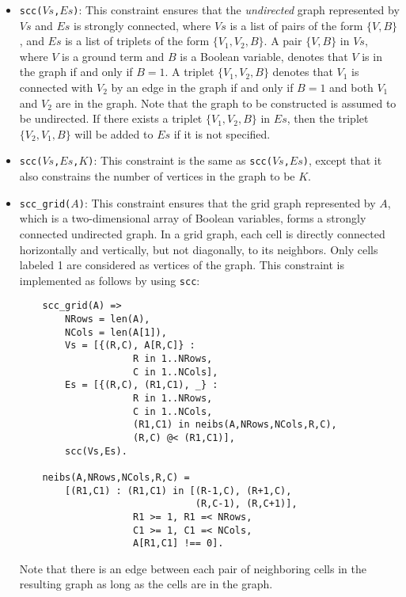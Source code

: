 \begin{itemize}
\item \texttt{scc($Vs$,$Es$)}: This constraint ensures that the \textit{undirected} graph represented by $Vs$ and $Es$ is strongly connected, where $Vs$ is a list of pairs of the form $\{V,B\}$, and $Es$ is a list of triplets of the form $\{V_1,V_2,B\}$. A pair $\{V,B\}$ in $Vs$, where $V$ is a ground term and $B$ is a Boolean variable, denotes that $V$ is in the graph if and only if $B = 1$. A triplet $\{V_1,V_2,B\}$ denotes that $V_1$ is connected with $V_2$  by an edge in the graph if and only if $B = 1$ and both $V_1$ and $V_2$ are in the graph. Note that the graph to be constructed is assumed to be undirected. If there exists a triplet $\{V_1,V_2,B\}$ in $Es$, then the triplet $\{V_2,V_1,B\}$ will be added to $Es$ if it is not specified.

\item \texttt{scc($Vs$,$Es$,$K$)}:  This constraint is the same as \texttt{scc($Vs$,$Es$)}, except that it also constrains the number of vertices in the graph to be $K$. 

\item \texttt{scc\_grid($A$)}:  This constraint ensures that the grid graph represented by $A$, which is a two-dimensional array of Boolean variables, forms a strongly connected undirected graph. In a grid graph, each cell is directly connected horizontally and vertically, but not diagonally, to its neighbors. Only cells labeled 1 are considered as vertices of the graph. This constraint is implemented as follows by using \texttt{scc}:
\begin{verbatim}
    scc_grid(A) =>
        NRows = len(A),
        NCols = len(A[1]),
        Vs = [{(R,C), A[R,C]} : 
                    R in 1..NRows, 
                    C in 1..NCols],
        Es = [{(R,C), (R1,C1), _} : 
                    R in 1..NRows, 
                    C in 1..NCols,
                    (R1,C1) in neibs(A,NRows,NCols,R,C),
                    (R,C) @< (R1,C1)],
        scc(Vs,Es).

    neibs(A,NRows,NCols,R,C) = 
        [(R1,C1) : (R1,C1) in [(R-1,C), (R+1,C), 
                               (R,C-1), (R,C+1)],
                    R1 >= 1, R1 =< NRows,
                    C1 >= 1, C1 =< NCols, 
                    A[R1,C1] !== 0].
\end{verbatim}
Note that there is an edge between each pair of neighboring cells in the resulting graph as long as the cells are in the graph.


\end{itemize}
